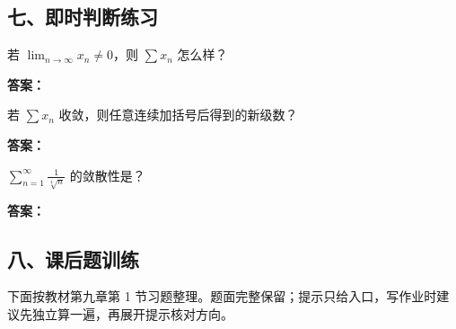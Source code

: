 \subsection*{七、即时判断练习}

\begin{quickcheck}
若 \(\lim_{n\to\infty}x_n\ne0\)，则 \(\sum x_n\) 怎么样？

\tcblower
\textbf{答案：}
\end{quickcheck}

\begin{quickcheck}
若 \(\sum x_n\) 收敛，则任意连续加括号后得到的新级数？

\tcblower
\textbf{答案：}
\end{quickcheck}

\begin{quickcheck}
\(\sum_{n=1}^{\infty}\frac1{\sqrt[4]{n}}\) 的敛散性是？

\tcblower
\textbf{答案：}
\end{quickcheck}

\subsection*{八、课后题训练}

下面按教材第九章第 1 节习题整理。题面完整保留；提示只给入口，写作业时建议先独立算一遍，再展开提示核对方向。

